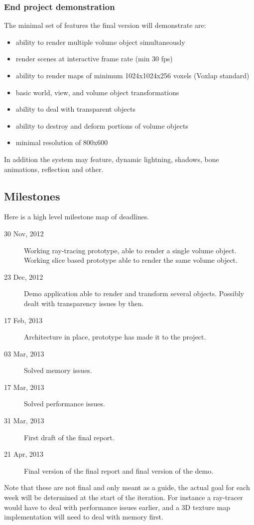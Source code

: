 \documentclass[11pt,fleqn,twoside]{article}
\begin{document}
\subsubsection{End project demonstration}
The minimal set of features the final version will demonstrate are:
\begin{itemize}
	\item ability to render multiple volume object simultaneously
	\item render scenes at interactive frame rate (min 30 fps)
	\item ability to render maps of minimum 1024x1024x256 voxels (Voxlap\cite{Voxlap} standard)
	\item basic world, view, and volume object transformations
	\item ability to deal with transparent objects
	\item ability to destroy and deform portions of volume objects
	\item minimal resolution of 800x600
\end{itemize}

In addition the system may feature, dynamic lightning, shadows, bone animations, reflection and other.

\subsection{Milestones}
Here is a high level milestone map of deadlines.

\begin{description}
	\item[30 Nov, 2012]		Working ray-tracing prototype, able to render a single volume object. 	Working slice based prototype able to render the same volume object.
	\item[23 Dec, 2012]		Demo application able to render and transform several objects. Possibly dealt with transparency issues by then.
	\item[17 Feb, 2013]		Architecture in place, prototype has made it to the project.
	\item[03 Mar, 2013]		Solved memory issues.
	\item[17 Mar, 2013]		Solved performance issues.
	\item[31 Mar, 2013]		First draft of the final report.
	\item[21 Apr, 2013]		Final version of the final report and final version of the demo. 
\end{description}

Note that these are not final and only meant as a guide, the actual goal for each week will be determined at the start of the iteration. For instance a ray-tracer would have to deal with performance issues earlier, and a 3D texture map implementation will need to deal with memory first.
\end{document}
